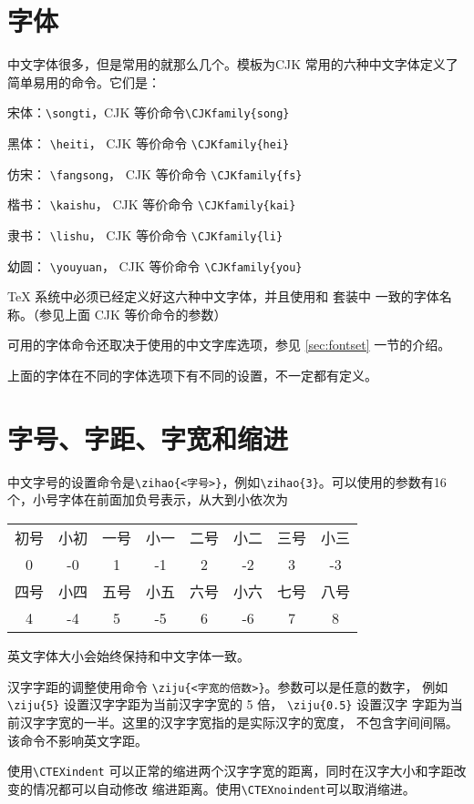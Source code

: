 \section{字体}
中文字体很多，但是常用的就那么几个。模板为CJK 常用的六种中文字体定义了简单易用的命令。它们是：

宋体：\verb|\songti|，CJK 等价命令\verb|\CJKfamily{song}|

黑体： \verb|\heiti|， CJK 等价命令 \verb|\CJKfamily{hei}|

仿宋： \verb|\fangsong|， CJK 等价命令 \verb|\CJKfamily{fs}|

楷书： \verb|\kaishu|， CJK 等价命令 \verb|\CJKfamily{kai}|

隶书： \verb|\lishu|， CJK 等价命令 \verb|\CJKfamily{li}|

幼圆： \verb|\youyuan|， CJK 等价命令 \verb|\CJKfamily{you}|

{\kaishu \TeX{} 系统中必须已经定义好这六种中文字体，并且使用和 \CTeX{} 套装中
一致的字体名称。（参见上面 CJK 等价命令的参数）

可用的字体命令还取决于使用的中文字库选项，参见 \ref{sec:fontset} 一节的介绍。

上面的字体在不同的字体选项下有不同的设置，不一定都有定义。}
\section{字号、字距、字宽和缩进}
中文字号的设置命令是\verb|\zihao{<字号>}|，例如\verb|\zihao{3}|。可以使用的参数有16 个，小号字体在前面加负号表示，从大到小依次为
\begin{center}
\begin{tabular}{cccccccc}
\toprule
初号 & 小初 & 一号 & 小一 & 二号 & 小二 & 三号 & 小三 \\
0 & -0 & 1 & -1 & 2 & -2 & 3 & -3 \\
\hline
四号 & 小四 & 五号 & 小五 & 六号 & 小六 & 七号 & 八号 \\
4 & -4 & 5 & -5 & 6 & -6 & 7 & 8 \\
\bottomrule
\end{tabular}
\end{center}
\noindent 英文字体大小会始终保持和中文字体一致。

汉字字距的调整使用命令 \verb|\ziju{<字宽的倍数>}|。参数可以是任意的数字，
例如 \verb|\ziju{5}| 设置汉字字距为当前汉字字宽的 5 倍， \verb|\ziju{0.5}| 设置汉字
字距为当前汉字字宽的一半。这里的汉字字宽指的是实际汉字的宽度，
不包含字间间隔。该命令不影响英文字距。

使用\verb|\CTEXindent| 可以正常的缩进两个汉字字宽的距离，同时在汉字大小和字距改变的情况都可以自动修改
缩进距离。使用\verb|\CTEXnoindent|可以取消缩进。
